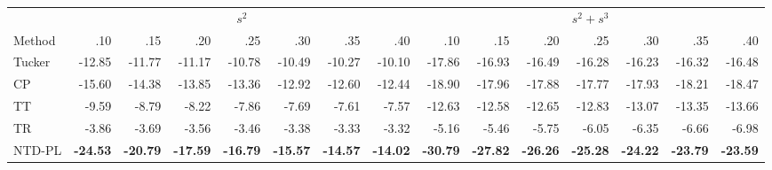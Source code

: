 \begin{tabular}{@{}lrrrrrrr@{\quad}rrrrrrr@{}}
\toprule
 & \multicolumn{7}{c}{\(s^2\)} & \multicolumn{7}{c}{\(s^2+s^3\)} \\
\cmidrule(lr){2-8}\cmidrule(l){9-15}
Method & .10 & .15 & .20 & .25 & .30 & .35 & .40 & .10 & .15 & .20 & .25 & .30 & .35 & .40 \\
\midrule
Tucker & -12.85 & -11.77 & -11.17 & -10.78 & -10.49 & -10.27 & -10.10 & -17.86 & -16.93 & -16.49 & -16.28 & -16.23 & -16.32 & -16.48 \\
CP     & -15.60 & -14.38 & -13.85 & -13.36 & -12.92 & -12.60 & -12.44 & -18.90 & -17.96 & -17.88 & -17.77 & -17.93 & -18.21 & -18.47 \\
TT     &  -9.59 &  -8.79 &  -8.22 &  -7.86 &  -7.69 &  -7.61 &  -7.57 & -12.63 & -12.58 & -12.65 & -12.83 & -13.07 & -13.35 & -13.66 \\
TR     &  -3.86 &  -3.69 &  -3.56 &  -3.46 &  -3.38 &  -3.33 &  -3.32 &  -5.16 &  -5.46 &  -5.75 &  -6.05 &  -6.35 &  -6.66 &  -6.98 \\
\midrule
NTD-PL & \textbf{-24.53} & \textbf{-20.79} & \textbf{-17.59} & \textbf{-16.79} & \textbf{-15.57} & \textbf{-14.57} & \textbf{-14.02} & \textbf{-30.79} & \textbf{-27.82} & \textbf{-26.26} & \textbf{-25.28} & \textbf{-24.22} & \textbf{-23.79} & \textbf{-23.59} \\
\bottomrule
\end{tabular}

